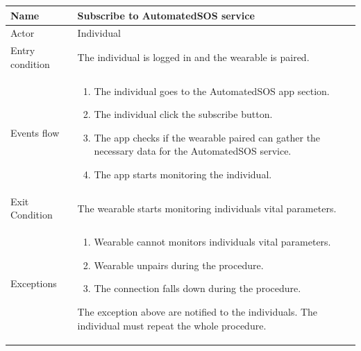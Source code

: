 \givespace

\begin{tabular}{|l|p{11cm}|}
    \hline
    Name & Subscribe to AutomatedSOS service
    \\ \hline
    Actor & Individual
    \\ \hline 
    Entry condition & The individual is logged in and the wearable is paired.
        \\ \hline
    Events flow &
    \begin{enumerate}
	\item The individual goes to the AutomatedSOS app section.
    \item The individual click the subscribe button.
    \item The app checks if the wearable paired can gather the necessary data for the AutomatedSOS service.
    \item The app starts monitoring the individual.
    \end{enumerate}
     \\ \hline
     Exit Condition & The wearable starts monitoring individuals vital parameters.
     \\
    \hline
    Exceptions &
        \begin{enumerate}
    \item Wearable cannot monitors individuals vital parameters.
    \item Wearable unpairs during the procedure.
    \item The connection falls down during the procedure.
    \end{enumerate}
      The exception above are notified to the individuals. The individual must repeat the whole 
      procedure.
      \\
    \hline
\end{tabular}

\givespace

